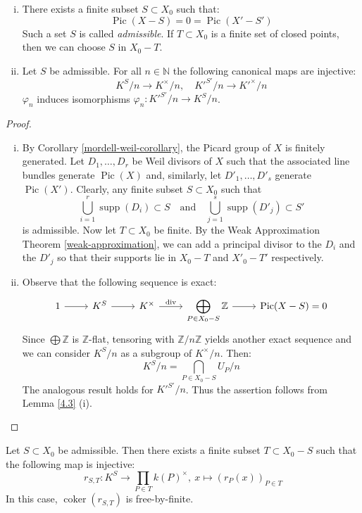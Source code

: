\begin{lemma}\label{4.5}
\begin{enumerate}[(i)]
\item There exists a finite subset $S\subset X_0$ such that:
\[ \operatorname{Pic}(X -  S)=0=\operatorname{Pic}(X' -  S') \]
Such a set $S$ is called \textit{admissible}. If $T\subset X_0$ is a finite set of closed points, then we can choose $S$ in $X_0 -  T$.
\item Let $S$ be admissible. For all $n\in\mathbb{N}$ the following canonical maps are injective:
\[ K^S/n \to K^\times /n,\quad K'^{S'}/n\to K'^\times /n \]
$\varphi_n$ induces isomorphisms $\varphi_n: K'^{S'}/n\to K^S/n$.
\end{enumerate}
\end{lemma}

\begin{proof}
\begin{enumerate}[(i)]
\item By Corollary \ref{mordell-weil-corollary}, the Picard group of $X$ is finitely generated. Let $D_1,\ldots, D_r$ be Weil divisors of $X$ such that the associated line bundles generate $\operatorname{Pic}(X)$ and, similarly, let $D'_1,\ldots,D'_s$ generate $\operatorname{Pic}(X')$. Clearly, any finite subset $S\subset X_0$ such that
\[ \bigcup_{i=1}^r \operatorname{supp}(D_i)\subset S\quad\text{and}\quad \bigcup_{j=1}^s\operatorname{supp}(D'_j)\subset S' \]
is admissible. Now let $T\subset X_0$ be finite. By the Weak Approximation Theorem \ref{weak-approximation}, we can add a principal divisor to the $D_i$ and the $D'_j$ so that their supports lie in $X_0 -  T$ and $X'_0 -  T'$ respectively.
\item Observe that the following sequence is exact:
\[ \begin{tikzcd}
1 \ar[r] & K^S \ar[r]& K^\times \ar[r, "\operatorname{div}"]& \displaystyle \bigoplus_{P\in X_0 -  S}\mathbb{Z} \ar[r]& \operatorname{Pic}(X -  S) = 0
\end{tikzcd} \]
Since $\bigoplus\mathbb{Z}$ is $\mathbb{Z}$-flat, tensoring with $\mathbb{Z}/n\mathbb{Z}$ yields another exact sequence and we can consider $K^S/n$ as a subgroup of $K^\times/n$. Then:
\[ K^S/n = \bigcap_{P\in X_0 -  S}U_P/n \]
The analogous result holds for $K'^{S'}/n$. Thus the assertion follows from Lemma \ref{4.3} (i).\qedhere
\end{enumerate}
\end{proof}

\begin{lemma}\label{5.4}
Let $S\subset X_0$ be admissible. Then there exists a finite subset $T\subset X_0 -  S$ such that the following map is injective:
\[ r_{S,T}:K^S \to\prod_{P\in T}k(P)^\times,\ x\mapsto(r_P(x))_{P\in T} \]
In this case, $\operatorname{coker}(r_{S,T})$ is free-by-finite.
\end{lemma}

